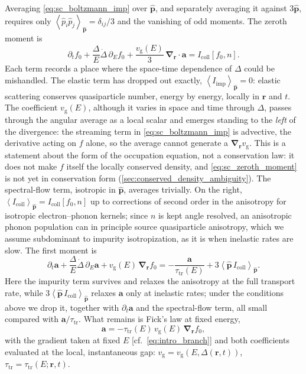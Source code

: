 \documentclass[
  aps,
  prb,
  preprint,
  superscriptaddress,
  longbibliography,
  nofootinbib
]{revtex4-2}
\newcommand{\avg}[1]{\left\langle #1 \right\rangle}
\newcommand{\br}{\mathbf{r}}
\newcommand{\bp}{\mathbf{p}}
\newcommand{\bnabla}{\boldsymbol{\nabla}}
\newcommand{\vg}{v_{\mathrm{g}}}
\newcommand{\tautr}{\tau_{\mathrm{tr}}}
\newcommand{\Icoll}{I_{\mathrm{coll}}}
\begin{document}
Averaging \cref{eq:sc_boltzmann_imp} over \(\hat{\bp}\), and separately
averaging it against \(3\hat{\bp}\), requires only
\(\avg{\hat{p}_i\hat{p}_j}_{\hat{\bp}}=\delta_{ij}/3\) and the vanishing of
odd moments. The zeroth moment is
\begin{equation}
  \partial_t f_{0}
  +
  \frac{\Delta}{E}\dot{\Delta}\,\partial_E f_{0}
  +
  \frac{\vg(E)}{3}\,
  \bnabla_{\br}\cdot\mathbf{a}
  =
  \Icoll[f_{0},n].
  \label{eq:sc_zeroth_moment}
\end{equation}
Each term records a place where the space-time dependence of \(\Delta\)
could be mishandled. The elastic term has dropped out exactly,
\(\avg{I_{\mathrm{imp}}}_{\hat{\bp}}=0\): elastic scattering conserves
quasiparticle number, energy by energy, locally in \(\br\) and \(t\). The
coefficient \(\vg(E)\), although it varies in space and time through
\(\Delta\), passes through the angular average as a local scalar and emerges
standing to the \emph{left} of the divergence: the streaming term in
\cref{eq:sc_boltzmann_imp} is advective, the derivative acting on \(f\)
alone, so the average cannot generate a \(\bnabla_{\br}\vg\). This is a
statement about the form of the occupation equation, not a conservation
law: it does not make \(f\) itself the locally conserved density, and
\cref{eq:sc_zeroth_moment} is not yet in conservation form
(\cref{sec:conserved_density_ambiguity}). The spectral-flow term,
isotropic in \(\hat{\bp}\), averages trivially. On the
right, \(\avg{\Icoll}_{\hat{\bp}}=\Icoll[f_{0},n]\) up to corrections of
second order in the anisotropy for isotropic electron--phonon kernels;
since \(n\) is kept angle resolved, an anisotropic phonon population
can in principle source quasiparticle anisotropy, which we assume
subdominant to impurity isotropization, as it is when inelastic rates
are slow. The first moment is
\begin{equation}
  \partial_t \mathbf{a}
  +
  \frac{\Delta}{E}\dot{\Delta}\,\partial_E \mathbf{a}
  +
  \vg(E)\,\bnabla_{\br} f_{0}
  =
  -\frac{\mathbf{a}}{\tautr(E)}
  +
  3\avg{\hat{\bp}\,\Icoll}_{\hat{\bp}}.
  \label{eq:sc_first_moment}
\end{equation}
Here the impurity term survives and relaxes the anisotropy at the full
transport rate, while \(3\avg{\hat{\bp}\,\Icoll}_{\hat{\bp}}\) relaxes
\(\mathbf{a}\) only at inelastic rates; under the conditions above we
drop it, together with \(\partial_t\mathbf{a}\) and the spectral-flow
term, all small compared with \(\mathbf{a}/\tautr\). What remains is
Fick's law at fixed energy,
\begin{equation}
  \mathbf{a}
  =
  -\tautr(E)\,\vg(E)\,
  \bnabla_{\br} f_{0},
  \label{eq:sc_fick}
\end{equation}
with the gradient taken at fixed \(E\) [cf.~\cref{eq:intro_branch}]
and both coefficients evaluated at the local, instantaneous gap:
\(\vg=\vg(E,\Delta(\br,t))\), \(\tautr=\tautr(E;\br,t)\).
\end{document}
